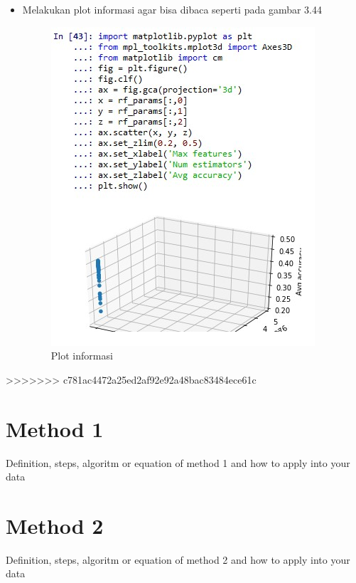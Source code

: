 \begin{enumerate}
\begin{itemize}
		\item Melakukan plot informasi agar bisa dibaca  seperti pada gambar 3.44
			\begin{figure}[ht]
			\centering
			\includegraphics[scale=0.7]{figures/PRF/8_2.png}
			\caption{Plot informasi}
			\end{figure}
	\end{itemize}
\end{enumerate}


>>>>>>> c781ac4472a25ed2af92e92a48bac83484ece61c
\section{Method 1}
Definition, steps, algoritm or equation of method 1 and how to apply into your data
\section{Method 2}
Definition, steps, algoritm or equation of method 2 and how to apply into your data